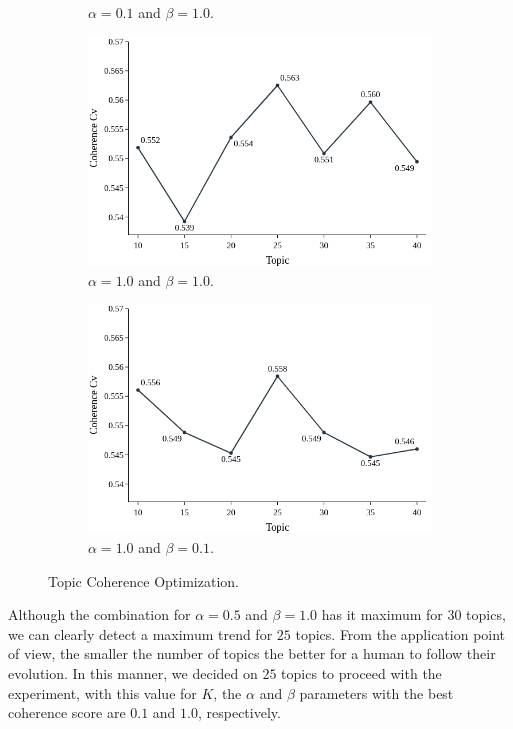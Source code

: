\begin{figure}[h!]
\begin{subfigure}{0.49\textwidth}
		\caption{$\alpha = 0.1$ and $\beta = 1.0$.}
	\end{subfigure}%
	\vfill
	\begin{subfigure}{0.49\textwidth}
		\includegraphics[width=\linewidth]{01.Chapters/05.Results/03_Topic_Cv_A:1.0| B:1.00}
		\caption{$\alpha = 1.0$ and $\beta = 1.0$.}
	\end{subfigure}%
	\hfill
	\begin{subfigure}{0.49\textwidth}
		\includegraphics[width=\linewidth]{01.Chapters/05.Results/04_Topic_Cv_A:1.0| B:0.10}
		\caption{$\alpha = 1.0$ and $\beta = 0.1$.}
	\end{subfigure}%
	\caption{Topic Coherence Optimization.}
	\label{fig:coherence-optimization}
\end{figure}

Although the combination for $\alpha = 0.5$ and $\beta = 1.0$ has it maximum for $30$ topics, we can clearly detect a maximum trend for $25$ topics. From the application point of view, the smaller the number of topics the better for a human to follow their evolution. In this manner, we decided on $25$ topics to proceed with the experiment, with this value for $K$, the $\alpha$ and $\beta$ parameters with the best coherence score are $0.1$ and $1.0$, respectively.


